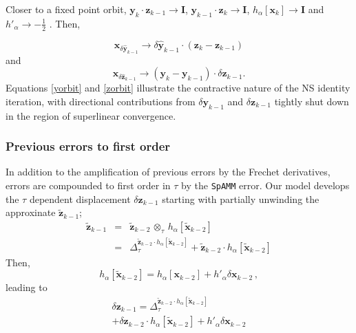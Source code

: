 \documentclass[letterpaper,twocolumn,amsmath,amsfont,amssymb,english,aps,jcp,preprintnumbers,groupaddress,nofootinbib,tightenlines]{revtex4}
\newcommand{\mat}[1]{\boldsymbol{#1}}
\newcommand{\ot}{ {\scriptstyle \otimes}_{ \tau } }
\begin{document}
Closer to a fixed point orbit,  $\mat{y}_k \cdot \mat{z}_{k-1} \rightarrow \mat{I}$, $\mat{y}_{k-1} \cdot \mat{z}_{k} \rightarrow \mat{I}$,
$h_\alpha \left[ \mat{x}_{k} \right] \rightarrow \mat{I}$ and $h'_\alpha \rightarrow - \frac{1}{2}$ \cite{higham2005}.  Then,

\begin{equation} \label{yorbit}
 \mat{x}_{\delta \widehat{ \mat{y}}_{k-1}} \rightarrow \delta \widehat{\mat{y}}_{k-1} \cdot \left( \mat{z}_k-\mat{z}_{k-1} \right)
\end{equation}
and
\begin{equation} \label{zorbit}
 \mat{x}_{\delta \widehat{ \mat{z}}_{k-1}} \rightarrow \left( \mat{y}_k-\mat{y}_{k-1} \right) \cdot \delta \widehat{\mat{z}}_{k-1} .
\end{equation}
Equations \ref{yorbit} and  \ref{zorbit} illustrate the contractive nature of the NS identity iteration, with directional
contributions from $\delta \mat{y}_{k-1}$ and $\delta \mat{z}_{k-1}$ tightly shut down in the region of superlinear convergence.

\subsubsection{Previous errors to first order}

In addition to the amplification of previous errors by the Frechet derivatives, errors are compounded to first order in $\tau$
by the {\tt SpAMM} error.  Our model develops the $\tau$  dependent displacement $\delta \mat{z}_{k-1}$ starting with partially unwinding
the approxinate  $\widetilde{\mat{z}}_{k-1}$;
\begin{eqnarray}
 \widetilde{\mat{z}}_{k-1} &=&  \widetilde{\mat{z}}_{k-2}  \, \ot \, h_\alpha[\widetilde{\mat{x}}_{k-2}]\\
&=& \Delta^{\widetilde{\mat{z}}_{k-2} \cdot h_\alpha \left[ \widetilde{\mat{x}}_{k-2}\right]}_\tau
+ \widetilde{\mat{z}}_{k-2} \cdot h_\alpha\left[ \widetilde{\mat{x}}_{k-2}\right]
\end{eqnarray}
Then,
\begin{equation}
  h_\alpha \left[ \widetilde{\mat{x}}_{k-2} \right]
=  h_\alpha \left[ \mat{x}_{k-2} \right] +  h'_\alpha  \delta \mat{x}_{k-2} \,  ,
\end{equation}
leading to
\begin{multline}
 \delta {\mat{z}}_{k-1} =\Delta^{\widetilde{\mat{z}}_{k-2} \cdot h_\alpha \left[ \widetilde{\mat{x}}_{k-2}\right]}_\tau
\\ +\delta \mat{z}_{k-2} \cdot h_\alpha \left[\widetilde{\mat{x}}_{k-2} \right]
+ h'_\alpha \delta \mat{x}_{k-2}
\end{multline}
\end{document}
